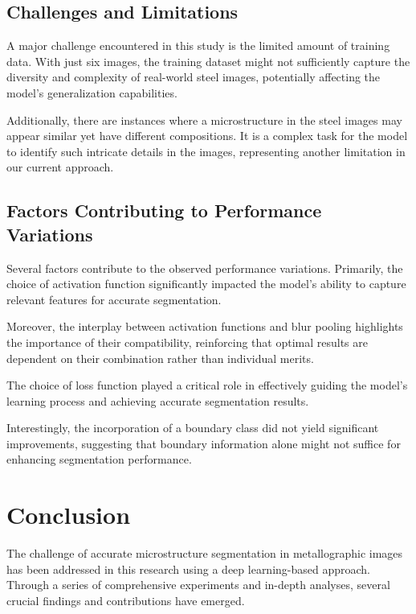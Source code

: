 \documentclass[]{article}
\begin{document}
\subsection{Challenges and Limitations}

A major challenge encountered in this study is the limited amount of training data. With just six images, the training dataset might not sufficiently capture the diversity and complexity of real-world steel images, potentially affecting the model's generalization capabilities. 

Additionally, there are instances where a microstructure in the steel images may appear similar yet have different compositions. It is a complex task for the model to identify such intricate details in the images, representing another limitation in our current approach.

\subsection{Factors Contributing to Performance Variations}

Several factors contribute to the observed performance variations. Primarily, the choice of activation function significantly impacted the model's ability to capture relevant features for accurate segmentation. 

Moreover, the interplay between activation functions and blur pooling highlights the importance of their compatibility, reinforcing that optimal results are dependent on their combination rather than individual merits. 

The choice of loss function played a critical role in effectively guiding the model's learning process and achieving accurate segmentation results. 

Interestingly, the incorporation of a boundary class did not yield significant improvements, suggesting that boundary information alone might not suffice for enhancing segmentation performance. 


\section{Conclusion}

The challenge of accurate microstructure segmentation in metallographic images has been addressed in this research using a deep learning-based approach. Through a series of comprehensive experiments and in-depth analyses, several crucial findings and contributions have emerged. 
\end{document}

